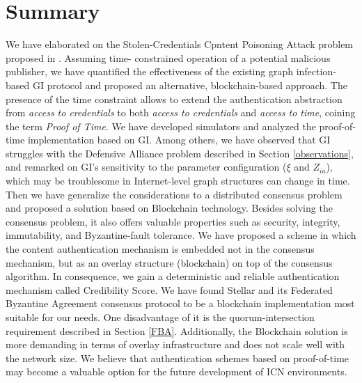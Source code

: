 \chapter{Summary}
We have elaborated on the Stolen-Credentials Cpntent Poisoning Attack problem proposed in \cite{konorski2019mitigating}. Assuming time- constrained operation of a potential malicious publisher, we have quantified the effectiveness of the existing graph infection-based GI protocol and proposed an alternative, blockchain-based approach. The presence of the time constraint allows to extend the authentication abstraction from \textit{access to credentials} to both \textit{access to credentials} and \textit{access to time}, coining the term \textit{Proof of Time}. We have developed simulators and analyzed the proof-of-time implementation based on GI. Among others, we have observed that GI struggles with the Defensive Alliance problem described in Section \ref{observations}, and remarked on GI's sensitivity to the parameter configuration ($\xi$ and $Z_{ia}$), which may be troublesome in Internet-level graph structures can change in time. Then we have generalize the considerations to a distributed consensus problem and proposed a solution based on Blockchain technology. Besides solving the consensus problem, it also offers valuable properties such as security, integrity, immutability, and Byzantine-fault tolerance. We have proposed a scheme in which the content authentication mechanism is embedded not in the consensus mechanism, but as an overlay structure (blockchain) on top of the consensus algorithm. In consequence, we gain a deterministic and reliable authentication mechanism called Credibility Score. We have found Stellar and its Federated Byzantine Agreement consensus protocol to be a blockchain implementation most suitable for our needs. One disadvantage of it is the quorum-intersection requirement described in Section \ref{FBA}. Additionally, the Blockchain solution is more demanding in terms of overlay infrastructure and does not scale well with the network size.
We believe that authentication schemes based on proof-of-time may become a valuable option for the future development of ICN environments.
